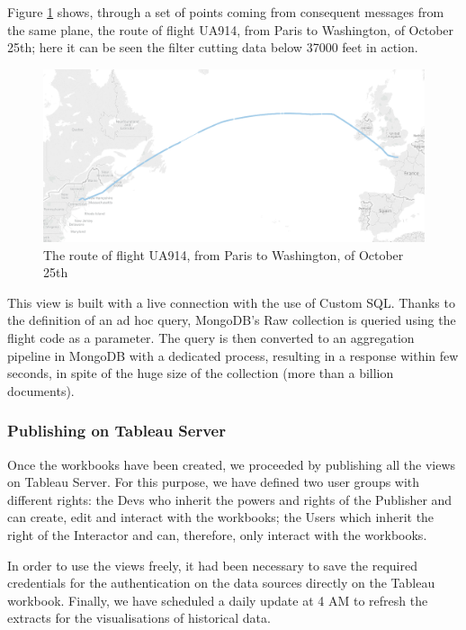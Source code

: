  Figure \ref{fig:RouteViz} shows, through a set of points coming from consequent messages from the same plane, the route of flight UA914, from Paris to Washington, of October 25th; here it can be seen the filter cutting data below 37000 feet in action.
\begin{figure}[h]
	\centering
	\includegraphics[width=0.9\linewidth]{Figures/RouteViz.png}
	\caption{The route of flight UA914, from Paris to Washington, of October 25th}
	\label{fig:RouteViz}
\end{figure}
This view is built with a live connection with the use of Custom SQL. Thanks to the definition of an ad hoc query, MongoDB's Raw collection is queried using the flight code as a parameter.
The query is then converted to an aggregation pipeline in MongoDB with a dedicated process, resulting in a response within few seconds, in spite of the huge size of the collection (more than a billion documents).
\subsubsection{Publishing on Tableau Server}
Once the workbooks have been created, we proceeded by publishing all the views on Tableau Server. For this purpose, we have defined two user groups with different rights: the Devs who inherit the powers and rights of the Publisher and can create, edit and interact with the workbooks; the Users which inherit the right of the Interactor and can, therefore, only interact with the workbooks.

In order to use the views freely, it had been necessary to save the required credentials for the authentication on the data sources directly on the Tableau workbook.
Finally, we have scheduled a daily update at 4 AM to refresh the extracts for the visualisations of historical data.